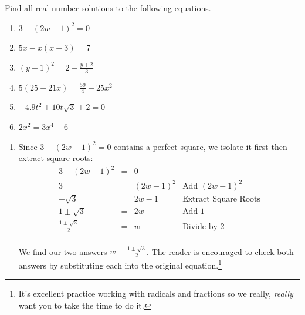 \documentclass{ximera}
\begin{document}
\begin{example}\label{reviewquadraticex}  Find all real number solutions to the following equations.

\begin{enumerate}

\item $3 - (2w-1)^2 = 0$

\item $5x - x(x-3) = 7$

\item  $(y-1)^2 = 2 - \frac{y+2}{3}$ 

\item $5(25 - 21x) = \frac{59}{4} - 25x^2$

\item $-4.9t^2 + 10t\sqrt{3} + 2 = 0$ 

\item $2x^2 = 3x^4 - 6$

\end{enumerate}


\begin{explanation}

\begin{enumerate}

\item  Since $3 - (2w-1)^2 = 0$ contains a perfect square, we isolate it first then extract square roots: \[ \begin{array}{rclr}

3 - (2w-1)^2 & = & 0 & \\

3 & = & (2w-1)^2 & \text{Add $(2w-1)^2$} \\

\pm \sqrt{3} & = & 2w - 1 & \text{Extract Square Roots} \\

1 \pm \sqrt{3} & = & 2w & \text{Add $1$} \\

\frac{1 \pm \sqrt{3}}{2} & = & w & \text{Divide by $2$} \\

\end{array} \]

We find our two answers $w = \frac{1 \pm \sqrt{3}}{2}$.  The reader is encouraged to check both answers by substituting each into the original equation.\footnote{It's excellent  practice working with radicals and fractions so we really, \emph{really} want you to take the time to do it.}


\end{enumerate}
\end{explanation}
\end{example}
\end{document}
